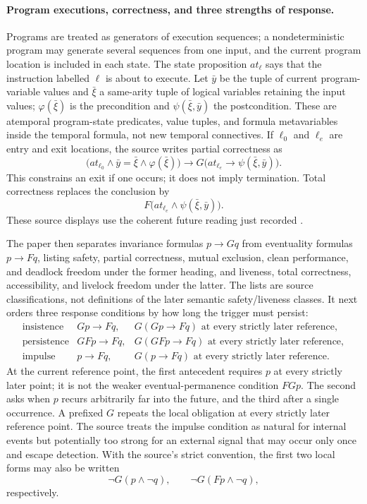 \paragraph{Program executions, correctness, and three strengths of response.}
Programs are treated as generators of execution sequences; a nondeterministic
program may generate several sequences from one input, and the current program
location is included in each state.  The state proposition
\(\mathit{at}_{\ell}\) says that the instruction labelled \(\ell\) is about to
execute.  Let \(\bar y\) be the tuple of current program-variable values and
\(\bar\xi\) a same-arity tuple of logical variables retaining the input values;
\(\varphi(\bar\xi)\) is the precondition and
\(\psi(\bar\xi,\bar y)\) the postcondition.  These are atemporal program-state
predicates, value tuples, and formula metavariables inside the temporal
formula, not new temporal connectives.  If \(\ell_0\) and \(\ell_e\) are entry
and exit locations, the source writes partial correctness as
\[
 \bigl(\mathit{at}_{\ell_0}\land \bar y=\bar\xi
       \land\varphi(\bar\xi)\bigr)
 \to
 G\bigl(\mathit{at}_{\ell_e}\to
        \psi(\bar\xi,\bar y)\bigr).
\]
This constrains an exit if one occurs; it does not imply termination.  Total
correctness replaces the conclusion by
\[
 F\bigl(\mathit{at}_{\ell_e}\land
        \psi(\bar\xi,\bar y)\bigr).
\]
These source displays use the coherent future reading just recorded
\cite[pp.~164--165]{GabbayPnueliShelahStavi1980}.

The paper then separates invariance formulas \(p\to Gq\) from eventuality
formulas \(p\to Fq\), listing safety, partial correctness, mutual exclusion,
clean performance, and deadlock freedom under the former heading, and
liveness, total correctness, accessibility, and livelock freedom under the
latter.  The lists are source classifications, not definitions of the later
semantic safety/liveness classes.  It next orders three response conditions by
how long the trigger must persist:
\[
\begin{array}{lll}
\text{insistence}   & Gp\to Fq,
                    & G(Gp\to Fq)\text{ at every strictly later reference},\\
\text{persistence}  & GFp\to Fq,
                    & G(GFp\to Fq)\text{ at every strictly later reference},\\
\text{impulse}      & p\to Fq,
                    & G(p\to Fq)\text{ at every strictly later reference}.
\end{array}
\]
At the current reference point, the first antecedent requires \(p\) at every
strictly later point; it is not the weaker eventual-permanence condition
\(FGp\).  The second asks when \(p\) recurs arbitrarily far into the future,
and the third after a single occurrence.  A prefixed \(G\) repeats the local
obligation at every strictly later reference point.  The source treats the
impulse condition as natural for internal events but potentially too strong
for an external signal that may occur only once and escape detection.  With
the source's strict convention, the first two local
forms may also be written
\[
 \neg G(p\land\neg q),
 \qquad
 \neg G(Fp\land\neg q),
\]
respectively.

